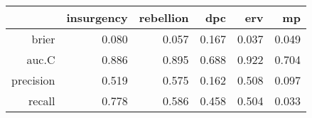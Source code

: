\begin{tabular}{rrrrrr}
  \hline
 & insurgency & rebellion & dpc & erv & mp \\ 
  \hline
brier & 0.080 & 0.057 & 0.167 & 0.037 & 0.049 \\ 
  auc.C & 0.886 & 0.895 & 0.688 & 0.922 & 0.704 \\ 
  precision & 0.519 & 0.575 & 0.162 & 0.508 & 0.097 \\ 
  recall & 0.778 & 0.586 & 0.458 & 0.504 & 0.033 \\ 
   \hline
\end{tabular}
